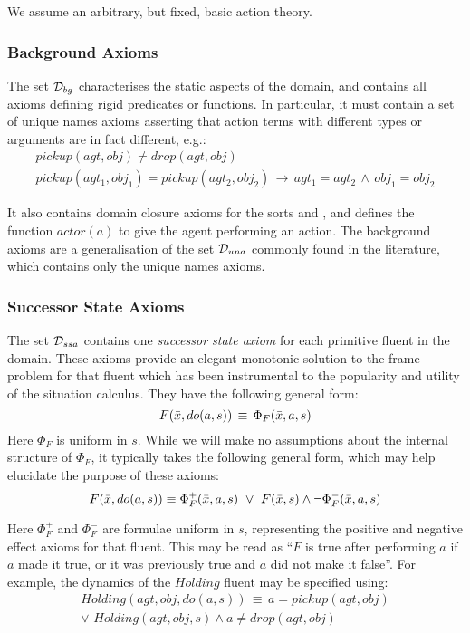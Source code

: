 We assume an arbitrary, but fixed, basic action theory.


\subsubsection{Background Axioms}

The set $\mathcal{D}_{bg}$ characterises the static aspects of the domain,
and contains all axioms defining rigid predicates or functions. In
particular, it must contain a set of unique names axioms asserting
that action terms with different types or arguments are in fact different,
e.g.:\begin{gather*}
pickup(agt,obj)\neq drop(agt,obj)\\
pickup(agt_{1},obj_{1})=pickup(agt_{2},obj_{2})\,\rightarrow\, agt_{1}=agt_{2}\,\wedge\, obj_{1}=obj_{2}\end{gather*}


It also contains domain closure axioms for the sorts  and , and defines the function $actor(a)$ to
give the agent performing an action. The background axioms are a generalisation
of the set $\mathcal{D}_{una}$ commonly found in the literature, which contains
only the unique names axioms.


\subsubsection{Successor State Axioms}

The set $\mathcal{D}_{ssa}$ contains one \emph{successor state axiom} for
each primitive fluent in the domain. These axioms provide an elegant
monotonic solution to the frame problem for that fluent \citep{reiter91frameprob}
which has been instrumental to the popularity and utility of the situation
calculus. They have the following general form:\[
F(\bar{x},do(a,s))\,\equiv\,\Phi_{F}(\bar{x},a,s)\]
 Here $\Phi_{F}$ is uniform in $s$. While we will make no assumptions
about the internal structure of $\Phi_{F}$, it typically takes the
following general form, which may help elucidate the purpose of these
axioms: \[
F(\bar{x},do(a,s))\equiv\Phi_{F}^{+}(\bar{x},a,s)\,\,\vee\,\, F(\bar{x},s)\wedge\neg\Phi_{F}^{-}(\bar{x},a,s)\]


Here $\Phi_{F}^{+}$ and $\Phi_{F}^{-}$ are formulae uniform in $s$,
representing the positive and negative effect axioms for that fluent.
This may be read as {}``$F$ is true after performing $a$ if $a$
made it true, or it was previously true and $a$ did not make it false''.
For example, the dynamics of the $Holding$ fluent may be specified
using:\begin{multline*}
Holding(agt,obj,do(a,s))\,\equiv\, a=pickup(agt,obj)\\
\vee\,\, Holding(agt,obj,s)\wedge a\neq drop(agt,obj)\end{multline*}


